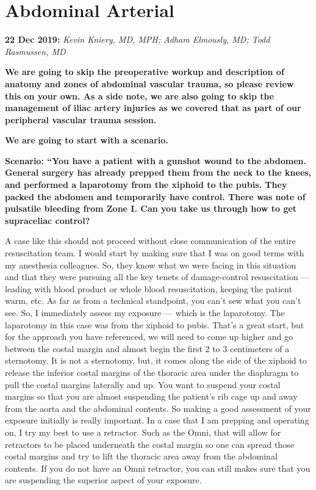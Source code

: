 \documentclass[
]{book}
\begin{document}
\hypertarget{abdominal-arterial}{%
\section{Abdominal Arterial}\label{abdominal-arterial}}

\textbf{22 Dec 2019:} \emph{Kevin Kniery, MD, MPH; Adham Elmously, MD; Todd
Rasmussen, MD}

\textbf{We are going to skip the preoperative workup and description of
anatomy and zones of abdominal vascular trauma, so please review this on
your own. As a side note, we are also going to skip the management of
iliac artery injuries as we covered that as part of our peripheral
vascular trauma session.}

\textbf{We are going to start with a scenario.}

\textbf{Scenario: ``You have a patient with a gunshot wound to the abdomen.
General surgery has already prepped them from the neck to the knees, and
performed a laparotomy from the xiphoid to the pubis. They packed the
abdomen and temporarily have control. There was note of pulsatile
bleeding from Zone I. Can you take us through how to get supraceliac
control?}

A case like this should not proceed without close communication of the
entire resuscitation team. I would start by making sure that I was on
good terms with my anesthesia colleagues. So, they know what we were
facing in this situation and that they were pursuing all the key tenets
of damage-control resuscitation --- leading with blood product or whole
blood resuscitation, keeping the patient warm, etc. As far as from a
technical standpoint, you can't sew what you can't see. So, I
immediately assess my exposure --- which is the laparotomy. The
laparotomy in this case was from the xiphoid to pubis. That's a great
start, but for the approach you have referenced, we will need to come up
higher and go between the costal margin and almost begin the first 2 to
3 centimeters of a sternotomy. It is not a sternotomy, but, it comes
along the side of the xiphoid to release the inferior costal margins of
the thoracic area under the diaphragm to pull the costal margins
laterally and up. You want to suspend your costal margins so that you
are almost suspending the patient's rib cage up and away from the aorta
and the abdominal contents. So making a good assessment of your exposure
initially is really important. In a case that I am prepping and
operating on, I try my best to use a retractor. Such as the Omni, that
will allow for retractors to be placed underneath the costal margin so
one can spread those costal margins and try to lift the thoracic area
away from the abdominal contents. If you do not have an Omni retractor,
you can still makes sure that you are suspending the superior aspect of
your exposure.
\end{document}
